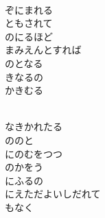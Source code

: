 \documentclass[10pt,b5j]{tarticle} %
\begin{document}
\vspace{1.5em} %
\newcommand{\linespace}{0.5em} %
\newcommand{\blocksize}{0.5\hsize} %
\newcommand{\itemmargin}{3em} %
\begin{enumerate} %
    \setlength{\itemindent}{\itemmargin} %
    \begin{minipage}[c]{\blocksize}
    
        \vspace{\linespace}
        \item~\\
        ぞにまれる\\
        ともされて\\
        のにるほど\\
        まみえんとすれば\\
        のとなる\\
        きなるの\\
        かきむる
        
    \end{minipage}
    \begin{minipage}[c]{\blocksize}
        
        \vspace{\linespace}
        \item~\\
        なきかれたる\\
        ののと\\
        にのむをつつ\\
        のかをう\\
        にふるの\\
        にえただよいしだれて\\
        もなく
        

\end{minipage}
\end{enumerate}
\end{document}

